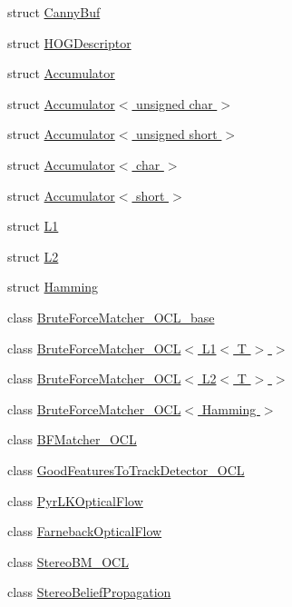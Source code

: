 \begin{DoxyCompactItemize}
struct \hyperlink{structcv_1_1ocl_1_1CannyBuf}{Canny\-Buf}
\item 
struct \hyperlink{structcv_1_1ocl_1_1HOGDescriptor}{H\-O\-G\-Descriptor}
\item 
struct \hyperlink{structcv_1_1ocl_1_1Accumulator}{Accumulator}
\item 
struct \hyperlink{structcv_1_1ocl_1_1Accumulator_3_01unsigned_01char_01_4}{Accumulator$<$ unsigned char $>$}
\item 
struct \hyperlink{structcv_1_1ocl_1_1Accumulator_3_01unsigned_01short_01_4}{Accumulator$<$ unsigned short $>$}
\item 
struct \hyperlink{structcv_1_1ocl_1_1Accumulator_3_01char_01_4}{Accumulator$<$ char $>$}
\item 
struct \hyperlink{structcv_1_1ocl_1_1Accumulator_3_01short_01_4}{Accumulator$<$ short $>$}
\item 
struct \hyperlink{structcv_1_1ocl_1_1L1}{L1}
\item 
struct \hyperlink{structcv_1_1ocl_1_1L2}{L2}
\item 
struct \hyperlink{structcv_1_1ocl_1_1Hamming}{Hamming}
\item 
class \hyperlink{classcv_1_1ocl_1_1BruteForceMatcher__OCL__base}{Brute\-Force\-Matcher\-\_\-\-O\-C\-L\-\_\-base}
\item 
class \hyperlink{classcv_1_1ocl_1_1BruteForceMatcher__OCL_3_01L1_3_01T_01_4_01_4}{Brute\-Force\-Matcher\-\_\-\-O\-C\-L$<$ L1$<$ T $>$ $>$}
\item 
class \hyperlink{classcv_1_1ocl_1_1BruteForceMatcher__OCL_3_01L2_3_01T_01_4_01_4}{Brute\-Force\-Matcher\-\_\-\-O\-C\-L$<$ L2$<$ T $>$ $>$}
\item 
class \hyperlink{classcv_1_1ocl_1_1BruteForceMatcher__OCL_3_01Hamming_01_4}{Brute\-Force\-Matcher\-\_\-\-O\-C\-L$<$ Hamming $>$}
\item 
class \hyperlink{classcv_1_1ocl_1_1BFMatcher__OCL}{B\-F\-Matcher\-\_\-\-O\-C\-L}
\item 
class \hyperlink{classcv_1_1ocl_1_1GoodFeaturesToTrackDetector__OCL}{Good\-Features\-To\-Track\-Detector\-\_\-\-O\-C\-L}
\item 
class \hyperlink{classcv_1_1ocl_1_1PyrLKOpticalFlow}{Pyr\-L\-K\-Optical\-Flow}
\item 
class \hyperlink{classcv_1_1ocl_1_1FarnebackOpticalFlow}{Farneback\-Optical\-Flow}
\item 
class \hyperlink{classcv_1_1ocl_1_1StereoBM__OCL}{Stereo\-B\-M\-\_\-\-O\-C\-L}
\item 
class \hyperlink{classcv_1_1ocl_1_1StereoBeliefPropagation}{Stereo\-Belief\-Propagation}

\end{DoxyCompactItemize}
